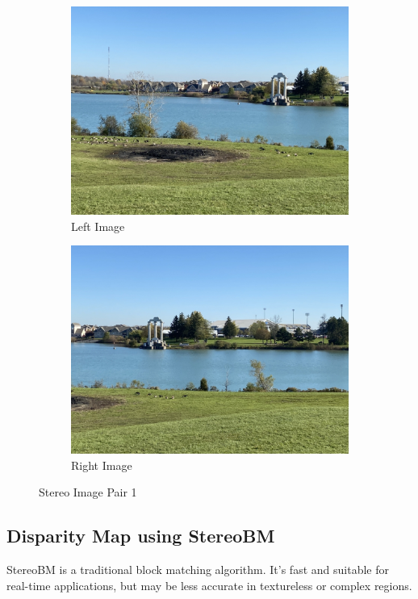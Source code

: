 \documentclass[12pt]{article}
\begin{document}
\begin{figure}[H]
    \centering
    \begin{subfigure}[b]{0.45\textwidth}
        \includegraphics[width=\textwidth]{left.jpg}
        \caption{Left Image}
    \end{subfigure}
    \hfill
    \begin{subfigure}[b]{0.45\textwidth}
        \includegraphics[width=\textwidth]{right.jpg}
        \caption{Right Image}
    \end{subfigure}
    \caption{Stereo Image Pair 1}
\end{figure}

\subsection{Disparity Map using StereoBM}
StereoBM is a traditional block matching algorithm. It's fast and suitable for real-time applications, but may be less accurate in textureless or complex regions.
\end{document}
